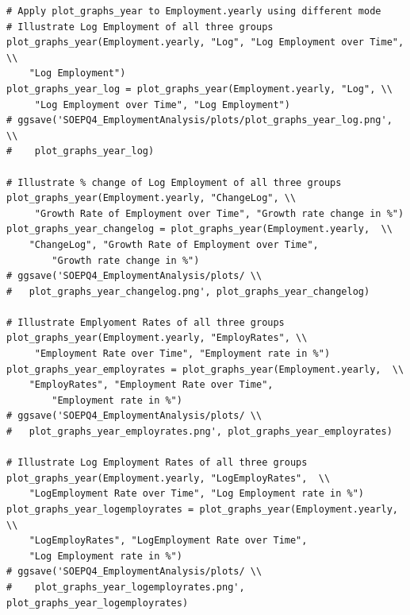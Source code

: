\documentclass[a4paper]{article}
\begin{document}
{\begin{lstlisting}
# Apply plot_graphs_year to Employment.yearly using different mode 
# Illustrate Log Employment of all three groups
plot_graphs_year(Employment.yearly, "Log", "Log Employment over Time", \\
	"Log Employment")
plot_graphs_year_log = plot_graphs_year(Employment.yearly, "Log", \\
	 "Log Employment over Time", "Log Employment")
# ggsave('SOEPQ4_EmploymentAnalysis/plots/plot_graphs_year_log.png', \\
#	 plot_graphs_year_log) 

# Illustrate % change of Log Employment of all three groups
plot_graphs_year(Employment.yearly, "ChangeLog", \\
	 "Growth Rate of Employment over Time", "Growth rate change in %")
plot_graphs_year_changelog = plot_graphs_year(Employment.yearly,  \\
	"ChangeLog", "Growth Rate of Employment over Time", 
    	"Growth rate change in %")
# ggsave('SOEPQ4_EmploymentAnalysis/plots/ \\
#	plot_graphs_year_changelog.png', plot_graphs_year_changelog) 

# Illustrate Emplyoment Rates of all three groups
plot_graphs_year(Employment.yearly, "EmployRates", \\
	 "Employment Rate over Time", "Employment rate in %")
plot_graphs_year_employrates = plot_graphs_year(Employment.yearly,  \\
	"EmployRates", "Employment Rate over Time", 
    	"Employment rate in %")
# ggsave('SOEPQ4_EmploymentAnalysis/plots/ \\
#	plot_graphs_year_employrates.png', plot_graphs_year_employrates) 

# Illustrate Log Employment Rates of all three groups
plot_graphs_year(Employment.yearly, "LogEmployRates",  \\
	"LogEmployment Rate over Time", "Log Employment rate in %")
plot_graphs_year_logemployrates = plot_graphs_year(Employment.yearly,  \\
	"LogEmployRates", "LogEmployment Rate over Time", 
    "Log Employment rate in %")
# ggsave('SOEPQ4_EmploymentAnalysis/plots/ \\
#    plot_graphs_year_logemployrates.png', plot_graphs_year_logemployrates)


\end{lstlisting}}
\end{document}
